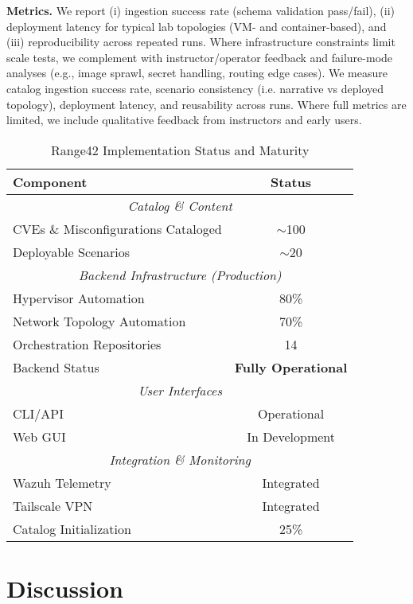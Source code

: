 \documentclass[11pt]{article}
\begin{document}
\textbf{Metrics.} 
We report (i) ingestion success rate (schema validation pass/fail), 
(ii) deployment latency for typical lab topologies (VM- and container-based), 
and (iii) reproducibility across repeated runs.
Where infrastructure constraints limit scale tests, 
we complement with instructor/operator feedback and failure-mode analyses 
(e.g., image sprawl, secret handling, routing edge cases).
We measure catalog ingestion success rate, 
scenario consistency (i.e. narrative vs deployed topology), 
deployment latency, 
and reusability across runs. 
Where full metrics are limited, 
we include qualitative feedback from instructors and early users.

\begin{table}[h]
\centering
\caption{Range42 Implementation Status and Maturity}
\label{tab:implementation}
\begin{tabular}{lc}
\hline
\textbf{Component} & \textbf{Status} \\
\hline
\multicolumn{2}{c}{\textit{Catalog \& Content}} \\
CVEs \& Misconfigurations Cataloged & $\sim$100 \\
Deployable Scenarios & $\sim$20 \\
\hline
\multicolumn{2}{c}{\textit{Backend Infrastructure (Production)}} \\
Hypervisor Automation & 80\% \\
Network Topology Automation & 70\% \\
Orchestration Repositories & 14 \\
Backend Status & \textbf{Fully Operational} \\
\hline
\multicolumn{2}{c}{\textit{User Interfaces}} \\
CLI/API & Operational \\
Web GUI & In Development \\
\hline
\multicolumn{2}{c}{\textit{Integration \& Monitoring}} \\
Wazuh Telemetry & Integrated \\
Tailscale VPN & Integrated \\
Catalog Initialization & 25\% \\
\hline
\end{tabular}
\end{table}

\section{Discussion}
\end{document}
